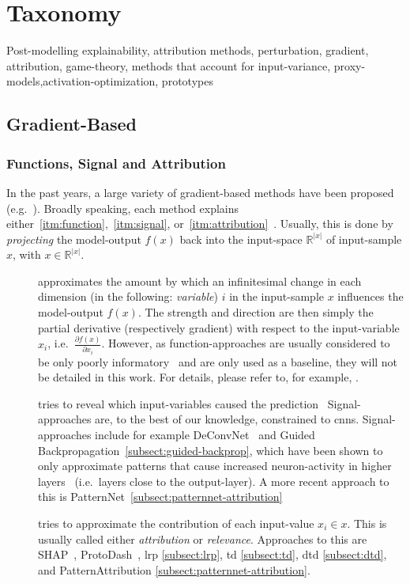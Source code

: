 \section{Taxonomy}
Post-modelling explainability, attribution methods, perturbation, gradient, attribution, game-theory, methods that account for input-variance, proxy-models,activation-optimization, prototypes

\subsection{Gradient-Based}
\subsubsection{Functions, Signal and Attribution} In the past years, a large variety of gradient-based methods have been proposed (e.g.~\cite{Bach.2015,Zeiler.2014,Springenberg.2015,Kindermans.2018,Lundberg.2017,Gurumoorthy.2017,Simonyan.2014,DanielSmilkov.,Sundararajan.2017,Landecker.2013,Zhang.2018,Shrikumar.,Selvaraju.2017}). Broadly speaking, each method explains either~\ref{itm:function},~\ref{itm:signal}, or~\ref{itm:attribution}~\cite{Kindermans.2018,Kindermans.2019}. Usually, this is done by \textit{projecting} the model-output \(f(x)\) back into the input-space \(\mathbb{R}^{|x|}\) of input-sample \(x\), with \(x\in \mathbb{R}^{|x|}\).
\begin{description}
    \item[] approximates the amount by which an infinitesimal change in each dimension (in the following: \textit{variable}) \(i\) in the input-sample \(x\) influences the model-output \(f(x)\). The strength and direction are then simply the partial derivative (respectively gradient) with respect to the input-variable \(x_i\), i.e.\ \(\frac{\partial f(x)}{\partial x_i}\). However, as function-approaches are usually considered to be only poorly informatory~\cite{Kindermans.2018} and are only used as a baseline, they will not be detailed in this work. For details, please refer to, for example, .
    \item[] tries to reveal which input-variables caused the prediction~\cite{Kindermans.2018,Zeiler.2014} Signal-approaches are, to the best of our knowledge, constrained to \glspl{cnn}. Signal-approaches include for example DeConvNet~\cite{Zeiler.2014} and Guided Backpropagation~\cref{subsect:guided-backprop}, which have been shown to only approximate patterns that cause increased neuron-activity in higher layers~\cite{Kindermans.2019} (i.e.\ layers close to the output-layer). A more recent approach to this is PatternNet~\cref{subsect:patternnet-attribution}
    \item[] tries to approximate the contribution of each input-value \(x_i\in x\). This is usually called either \textit{attribution} or \textit{relevance}. Approaches to this are SHAP~\cite{Lundberg.2017}, ProtoDash~\cite{Gurumoorthy.2017}, \gls{lrp} \cref{subsect:lrp}, \gls{td} \cref{subsect:td}, \gls{dtd} \cref{subsect:dtd}, and PatternAttribution \cref{subsect:patternnet-attribution}.
\end{description}

